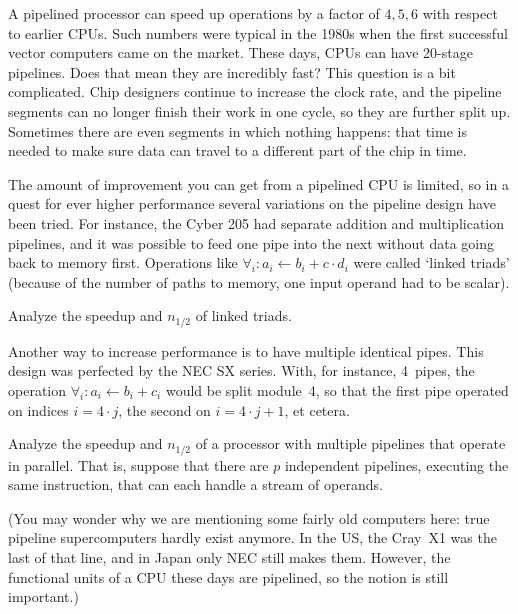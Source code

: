A pipelined processor can speed up operations by a factor of $4,5,6$
with respect to earlier CPUs. Such numbers were typical in the 1980s
when the first successful vector computers came on the market. These
days, CPUs can have 20-stage pipelines. Does that mean they are
incredibly fast? This question is a bit complicated. Chip designers
continue to increase the clock rate, and the pipeline segments can no
longer finish their work in one cycle, so they are further split
up. Sometimes there are even segments in which nothing happens: that
time is needed to make sure data can travel to a different part of the
chip in time.


The amount of improvement you can get from a pipelined CPU is limited,
so in a quest for ever higher performance several variations on the
pipeline design have been tried. For instance, the Cyber 205 had
separate addition and multiplication pipelines, and it was possible to
feed one pipe into the next without data going back to memory
first. Operations like $\forall_i\colon a_i\leftarrow b_i+c\cdot d_i$
were called `linked triads' (because of the number of paths to memory,
one input operand had to be scalar).

\begin{exercise}
  Analyze the speedup and $n_{1/2}$ of linked triads.
\end{exercise}

Another way to increase performance is to have multiple identical
pipes. This design was perfected by the NEC SX series. With, for
instance, 4~pipes, the operation $\forall_i\colon a_i\leftarrow
b_i+c_i$ would be split module~4, so that the first pipe operated on
indices $i=4\cdot j$, the second on $i=4\cdot j+1$, et cetera.

\begin{exercise}
  Analyze the speedup and $n_{1/2}$ of a processor with multiple
  pipelines that operate in parallel. That is, suppose that there are
  $p$ independent pipelines, executing the same instruction, that can
  each handle a stream of operands.
\end{exercise}

(You may wonder why we are mentioning some fairly old computers here:
true pipeline supercomputers hardly exist anymore. In the US, the
Cray~X1 was the last of that line, and in Japan only NEC still makes
them. However, the functional units of a CPU these days are pipelined,
so the notion is still important.)

